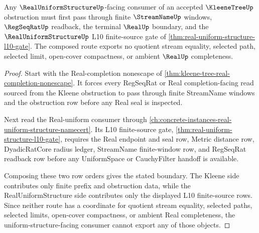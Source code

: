 \begin{theorem}
\label{thm:kleene-tree-uniform-structure-boundary}
Any $\RealUniformStructureUp$-facing consumer of an accepted $\KleeneTreeUp$ obstruction must first pass through finite $\StreamNameUp$ windows, $\RegSeqRatUp$ readback, the terminal $\RealUp$ boundary, and the $\RealUniformStructureUp$ L10 finite-source gate of \autoref{thm:real-uniform-structure-l10-gate}. The composed route exports no quotient stream equality, selected path, selected limit, open-cover compactness, or ambient $\RealUp$ completeness.
\end{theorem}
\begin{proof}
Start with the Real-completion nonescape of \autoref{thm:kleene-tree-real-completion-nonescape}. It forces every RegSeqRat or Real completion-facing read sourced from the Kleene obstruction to pass through finite StreamName windows and the obstruction row before any Real seal is inspected.

Next read the Real-uniform consumer through \autoref{ch:concrete-instances-real-uniform-structure-namecert}. Its L10 finite-source gate, \autoref{thm:real-uniform-structure-l10-gate}, requires the Real endpoint and seal row, Metric distance row, DyadicRatCore radius ledger, StreamName finite-window row, and RegSeqRat readback row before any UniformSpace or CauchyFilter handoff is available.

Composing these two row orders gives the stated boundary. The Kleene side contributes only finite prefix and obstruction data, while the RealUniformStructure side contributes only the displayed L10 finite-source rows. Since neither route has a coordinate for quotient stream equality, selected paths, selected limits, open-cover compactness, or ambient Real completeness, the uniform-structure-facing consumer cannot export any of those objects.
\end{proof}

